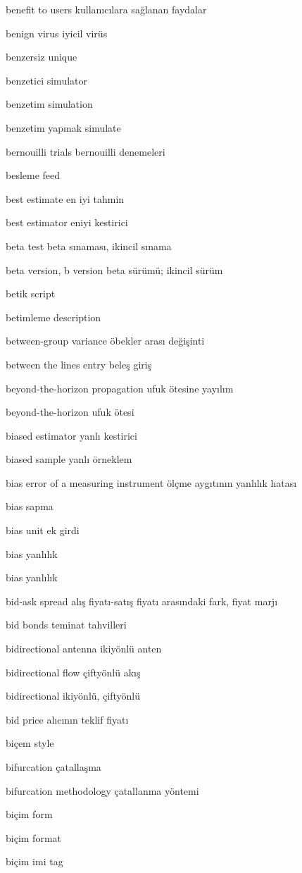 \documentclass[12pt,fleqn]{article}\usepackage{../../common}
\begin{document}
benefit to users kullanıcılara sağlanan faydalar

benign virus iyicil virüs

benzersiz unique

benzetici simulator

benzetim simulation

benzetim yapmak simulate

bernouilli trials bernouilli denemeleri

besleme feed

best estimate en iyi tahmin

best estimator eniyi kestirici

beta test beta sınaması, ikincil sınama

beta version, b version beta sürümü; ikincil sürüm

betik script

betimleme description

between-group variance öbekler arası değişinti

between the lines entry beleş giriş

beyond-the-horizon propagation ufuk ötesine yayılım

beyond-the-horizon ufuk ötesi

biased estimator yanlı kestirici

biased sample yanlı örneklem

bias error of a measuring instrument ölçme aygıtının yanlılık hatası

bias sapma

bias unit ek girdi

bias yanlılık

bias yanlılık

bid-ask spread alış fiyatı-satış fiyatı arasındaki fark, fiyat marjı

bid bonds teminat tahvilleri

bidirectional antenna ikiyönlü anten

bidirectional flow çiftyönlü akış

bidirectional ikiyönlü, çiftyönlü

bid price alıcının teklif fiyatı

biçem style

bifurcation çatallaşma

bifurcation methodology çatallanma yöntemi

biçim form

biçim format

biçim imi tag
\end{document}

